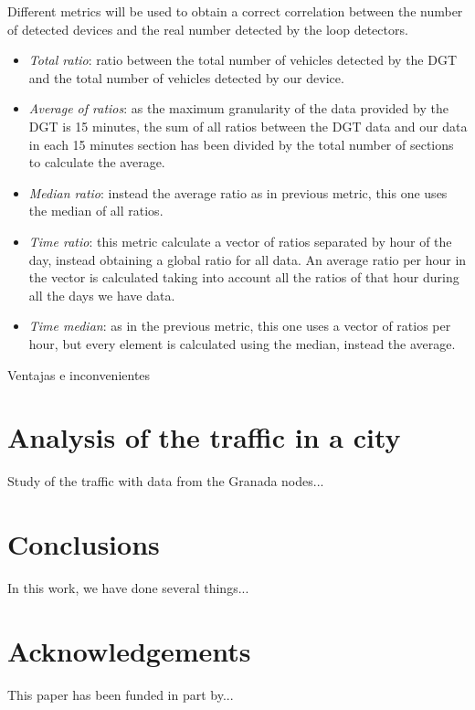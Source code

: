 \documentclass[preprint]{elsarticle}
\begin{document}
Different metrics will be used to obtain a correct correlation between the number of detected devices and the real number detected by the loop detectors.

\begin{itemize}
\item {\em Total ratio}: ratio between the total number of vehicles detected by the DGT and the total number of vehicles detected by our device.
\item {\em Average of ratios}: as the maximum granularity of the data provided by the DGT is 15 minutes, the sum of all ratios between the DGT data and our data in each 15 minutes section has been divided by the total number of sections to calculate the average.
\item {\em Median ratio}: instead the average ratio as in previous metric, this one uses the median of all ratios.
\item {\em Time ratio}: this metric calculate a vector of ratios separated by hour of the day, instead obtaining a global ratio for all data. An average ratio per hour in the vector is calculated taking into account all the ratios of that hour during all the days we have data.
\item {\em Time median}: as in the previous metric, this one uses a vector of ratios per hour, but every element is calculated using the median, instead the average.
\end{itemize}

Ventajas e inconvenientes




\section{Analysis of the traffic in a city}
\label{sec:city}

Study of the traffic with data from the Granada nodes...



\section{Conclusions}
\label{sec:conclusions}

In this work, we have done several things...


\section{Acknowledgements}
This paper has been funded in part by...



\end{document}
